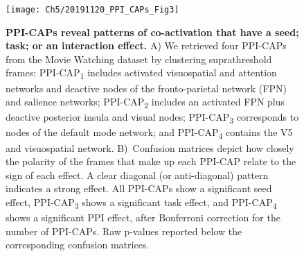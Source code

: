 \begin{figure}[t!]
\centering
\texttt{[image: Ch5/20191120\_PPI\_CAPs\_Fig3]}
\vspace*{-3mm}
\caption{\textbf{PPI-CAPs reveal patterns of co-activation that have a seed; task; or an interaction effect.} A) We retrieved four PPI-CAPs from the Movie Watching dataset by clustering suprathreshold frames: PPI-CAP\textsubscript{1} includes activated visuospatial and attention networks and deactive nodes of the fronto-parietal network (FPN) and salience networks; PPI-CAP\textsubscript{2} includes an activated FPN plus deactive posterior insula and visual nodes; PPI-CAP\textsubscript{3} corresponds to nodes of the default mode network; and PPI-CAP\textsubscript{4} contains the V5 and visuospatial network. B)~Confusion matrices depict how closely the polarity of the frames that make up each PPI-CAP relate to the sign of each effect. A clear diagonal (or anti-diagonal) pattern indicates a strong effect. All PPI-CAPs show a significant seed effect, PPI-CAP\textsubscript{3} shows a significant task effect, and PPI-CAP\textsubscript{4} shows a significant PPI effect, after Bonferroni correction for the number of PPI-CAPs. Raw p-values reported below the corresponding confusion matrices.}
\label{fig:PPI_CAPs_Fig3}
\end{figure}



